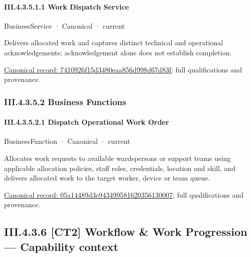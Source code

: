 \paragraph*{III.4.3.5.1.1 Work Dispatch Service}
\label{navigation:III.4.3.5.1.1}

\label{element:7410926f15d3480eaa856d998d67d83f}
{\small BusinessService · Canonical · current}\par

Delivers allocated work and captures distinct technical and operational acknowledgements; acknowledgement alone does not establish completion.


{\footnotesize \href{../../../../../../../continuum/business/business-service/7410926f15d3480eaa856d998d67d83f.md}{Canonical record: 7410926f15d3480eaa856d998d67d83f}; full qualifications and provenance.}\par
\subsubsection*{III.4.3.5.2 Business Functions}
\label{navigation:III.4.3.5.2}

\paragraph*{III.4.3.5.2.1 Dispatch Operational Work Order}
\label{navigation:III.4.3.5.2.1}

\label{element:05a14489d3e943499581620356130007}
{\small BusinessFunction · Canonical · current}\par

Allocates work requests to available wardspersons or support teams using applicable allocation policies, staff roles, credentials, location and skill, and delivers allocated work to the target worker, device or team queue.


{\footnotesize \href{../../../../../../../continuum/business/business-function/05a14489d3e943499581620356130007.md}{Canonical record: 05a14489d3e943499581620356130007}; full qualifications and provenance.}\par
\subsection*{III.4.3.6 [CT2] Workflow \& Work Progression — Capability context}
\label{navigation:III.4.3.6}


